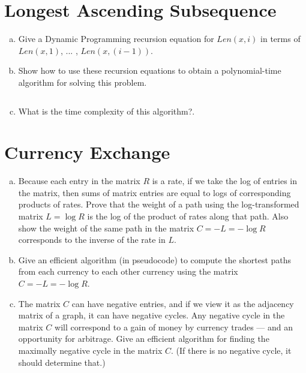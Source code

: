 \documentclass[12pt]{article}
\begin{document}
\section{Longest Ascending Subsequence}\label{ascending subsequence}
\begin{enumerate}[(a)]
\item Give a Dynamic Programming recursion equation for $Len(x,i)$ in terms of $Len(x,1)$, ... , $Len(x,(i − 1))$.
\begin{addmargin}[2em]{2em}

\end{addmargin}
\item Show how to use these recursion equations to obtain a polynomial-time algorithm for solving this problem.
\begin{addmargin}[2em]{2em}

\begin{lstlisting}

\end{lstlisting}
\end{addmargin}
\item What is the time complexity of this algorithm?.
\begin{addmargin}[2em]{2em}

\end{addmargin}
\end{enumerate}

\section{Currency Exchange}\label{currency exchange}
\begin{enumerate}[(a)]
\item Because each entry in the matrix $R$ is a rate, if we take the log of entries in the matrix, then sums of matrix entries are equal to logs of corresponding products of rates. Prove that the weight of a path using the log-transformed matrix $L = \log R$ is the log of the product of rates along that path. Also show the weight of the same path in the matrix $C = −L = − \log R$ corresponds to the inverse of the rate in $L$.
\begin{addmargin}[2em]{2em}

\end{addmargin}
\item Give an efficient algorithm (in pseudocode) to compute the shortest paths from each currency to each other currency using the matrix $C = −L = − \log R$.
\begin{addmargin}[2em]{2em}

\end{addmargin}
\item The matrix $C$ can have negative entries, and if we view it as the adjacency matrix of a graph, it can have negative cycles. Any negative cycle in the matrix $C$ will correspond to a gain of money by currency trades — and an opportunity for arbitrage. Give an efficient algorithm for finding the maximally negative cycle in the matrix $C$. (If there is no negative cycle, it should determine that.)
\begin{addmargin}[2em]{2em}

\end{addmargin}
\end{enumerate}
\end{document}
